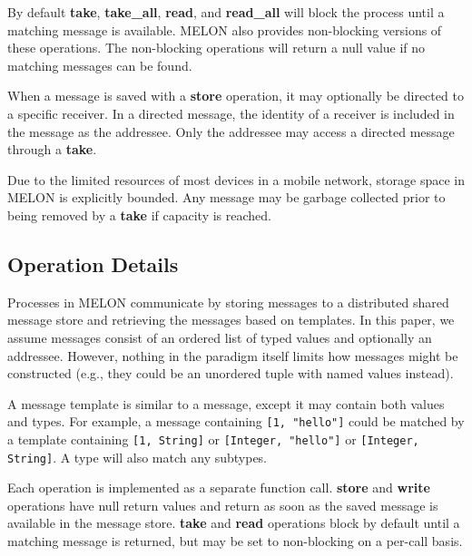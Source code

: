 \documentclass[lnicst]{svmultln}
\begin{document}
By default \textbf{take}, \textbf{take\_all}, \textbf{read}, and \textbf{read\_all} will block the process until a matching message is available. MELON also provides non-blocking versions of these operations. The non-blocking operations will return a null value if no matching messages can be found.

When a message is saved with a \textbf{store} operation, it may optionally be directed to a specific receiver. In a directed message, the identity of a receiver is included in the message as the addressee. Only the addressee may access a directed message through a \textbf{take}.

Due to the limited resources of most devices in a mobile network, storage space in MELON is explicitly bounded. Any message may be garbage collected prior to being removed by a \textbf{take} if capacity is reached.

\subsection{Operation Details}

Processes in MELON communicate by storing messages to a distributed shared message store and retrieving the messages based on templates. In this paper, we assume messages consist of an ordered list of typed values and optionally an addressee. However, nothing in the paradigm itself limits how messages might be constructed (e.g., they could be an unordered tuple with named values instead).

A message template is similar to a message, except it may contain both values and types. For example, a message containing \texttt{[1, "hello"]} could be matched by a template containing \texttt{[1, String]} or \texttt{[Integer, "hello"]} or \texttt{[Integer, String]}. A type will also match any subtypes.

Each operation is implemented as a separate function call. \textbf{store} and \textbf{write} operations have null return values and return as soon as the saved message is available in the message store. \textbf{take} and \textbf{read} operations block by default until a matching message is returned, but may be set to non-blocking on a per-call basis.
\end{document}
